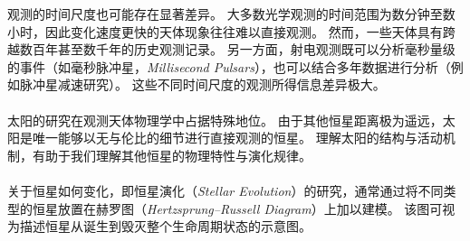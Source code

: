 观测的时间尺度也可能存在显著差异。  
大多数光学观测的时间范围为数分钟至数小时，因此变化速度更快的天体现象往往难以直接观测。  
然而，一些天体具有跨越数百年甚至数千年的历史观测记录。  
另一方面，射电观测既可以分析毫秒量级的事件（如毫秒脉冲星，\textit{Millisecond Pulsars}），也可以结合多年数据进行分析（例如脉冲星减速研究）。  
这些不同时间尺度的观测所得信息差异极大。

\paragraph{}
太阳的研究在观测天体物理学中占据特殊地位。  
由于其他恒星距离极为遥远，太阳是唯一能够以无与伦比的细节进行直接观测的恒星。  
理解太阳的结构与活动机制，有助于我们理解其他恒星的物理特性与演化规律。

\paragraph{}
关于恒星如何变化，即恒星演化（\textit{Stellar Evolution}）的研究，通常通过将不同类型的恒星放置在赫罗图（\textit{Hertzsprung–Russell Diagram}）上加以建模。  
该图可视为描述恒星从诞生到毁灭整个生命周期状态的示意图。
